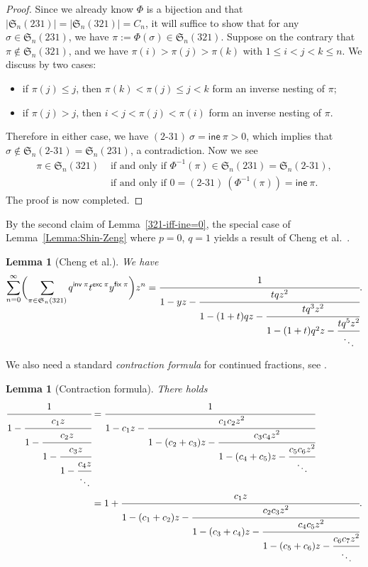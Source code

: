 \documentclass[12pt,reqno]{amsart}
\numberwithin{equation}{section}
\theoremstyle{plain}
\newtheorem{lemma}[theorem]{Lemma}
\theoremstyle{definition}
\def\S{\mathfrak{S}}
\def\exc{\mathsf{exc}}
\def\inv{\mathsf{inv}}
\def\fix{\mathsf{fix}}
\def\ine{\mathsf{ine}}
\def\bca{2\text{-}31}
\begin{document}
\begin{proof}
Since we already know $\varPhi$ is a bijection and that $|\S_n(231)|=|\S_n(321)|=C_n$, it will suffice to show that for any $\sigma\in\S_n(231)$, we have $\pi:=\varPhi(\sigma)\in\S_n(321)$. Suppose on the contrary that $\pi\not\in\S_n(321)$, and we have $\pi(i)>\pi(j)>\pi(k)$ with $1\le i<j<k\le n$. We discuss by two cases:
\begin{itemize}
    \item if $\pi(j)\le j$, then $\pi(k)<\pi(j)\le j<k$ form an inverse nesting of $\pi$;
    \item if $\pi(j)> j$, then $i<j< \pi(j)<\pi(i)$ form an inverse nesting of $\pi$.
\end{itemize}
Therefore in either case, we have $(\bca)\:\sigma=\ine\:\pi>0$, which implies that $\sigma\not\in \S_n(\bca)=\S_n(231)$, a contradiction. Now we see
\begin{align*}
\pi\in\S_n(321) & \text{ if and only if } \varPhi^{-1}(\pi)\in\S_n(231)=\S_n(\bca),\\
& \text{ if and only if } 0=(\bca)\:(\varPhi^{-1}(\pi)) = \ine\: \pi.
\end{align*}
The proof is now completed.
\end{proof}

By the second claim of Lemma~\ref{321-iff-ine=0}, the special case of Lemma~\ref{Lemma:Shin-Zeng} where $p=0$, $q=1$ yields a result of Cheng et al.~\cite[Theorem 7.3]{CEKS}.
\begin{lemma}[Cheng et al.]\label{SZ10p_0}
We have
\begin{align}\label{CEKS}
\sum_{n=0}^{\infty} \biggl(\sum_{\pi\in \S_n(321)} q^{\inv\:\pi}t^{\exc\:\pi}y^{\fix\:\pi}\biggr)z^n
=\cfrac{1}{1-yz-\cfrac{tqz^2}{1-(1+t)qz-\cfrac{tq^3z^2}{1-(1+t)q^2z-\cfrac{tq^5z^2}{\ddots}}}}.
\end{align}
\end{lemma}

We also need a standard \emph{contraction formula} for continued fractions, see \cite[Eqs. (43) and (44)]{SZ10}.
\begin{lemma}[Contraction formula]\label{contra-formula}
There holds
\begin{align*}
\cfrac{1}{
1-\cfrac{c_{1}z}{1-\cfrac{c_{2}z}{
1-\cfrac{c_{3}z}{
1-\cfrac{c_{4}z}
{\ddots}}}}}
&=\cfrac{1}{1-c_{1}z-\cfrac{c_{1}c_{2}z^{2}}{1-(c_{2}+c_{3})z-\cfrac{c_{3}c_{4}z^{2}}{1-(c_4+c_5)z-\cfrac{c_5c_6z^2}{\ddots}}}}\\
&=1+\cfrac{c_{1}z}{1-(c_{1}+c_{2})z-\cfrac{c_{2}c_{3}z^{2}}{1-(c_{3}+c_{4})z-\cfrac{c_{4}c_{5}z^{2}}{1-(c_5+c_6)z-\cfrac{c_6c_7z^2}{\ddots}}}}.
\end{align*}
\end{lemma}
\end{document}
